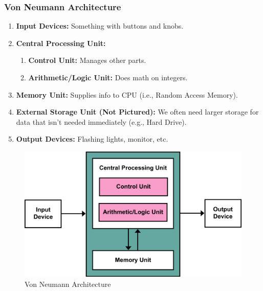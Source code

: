 \documentclass{beamer}
\begin{document}
%
%
\begin{frame}
  \frametitle{Von Neumann Architecture}
  \begin{minipage}{0.59\textwidth}
    \begin{enumerate}
      \item \textbf{Input Devices: } Something with buttons and knobs.
      \item \textbf{Central Processing Unit:}
        \begin{enumerate}
          \item \textbf{Control Unit: } Manages other parts.
          \item \textbf{Arithmetic/Logic Unit: } Does math on integers.
        \end{enumerate}
      \item \textbf{Memory Unit: } Supplies info to CPU (i.e., Random Access Memory).
      \item \textbf{External Storage Unit (Not Pictured): } We often need larger storage for data that isn't needed immediately (e.g., Hard Drive).
      \item \textbf{Output Devices: } Flashing lights, monitor, etc.
    \end{enumerate}
  \end{minipage}
  \begin{minipage}{0.39\textwidth}
    \begin{figure}
      \includegraphics[width=\textwidth]{imgs/von-neumann-arch.png}
      \caption{Von Neumann Architecture}
      \label{fig:vonneumannarch}
    \end{figure}
  \end{minipage}
\end{frame}
\end{document}

